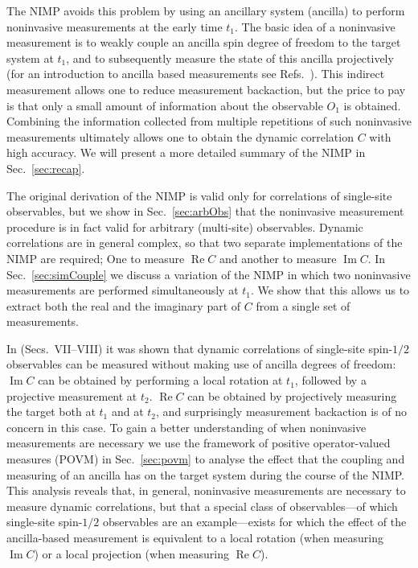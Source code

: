 \documentclass[epjST,numbook]{svjour}
\DeclareMathOperator{\imp }{\mathrm{Im}}
\DeclareMathOperator{\rep}{\mathrm{Re}}
\begin{document}
The NIMP avoids this problem by using an ancillary system (ancilla) to perform noninvasive measurements at the early time $t_1$. The basic idea of a noninvasive measurement is to weakly couple an ancilla spin degree of freedom to the target system at $t_1$, and to subsequently measure the state of this ancilla projectively (for an introduction to ancilla based measurements see Refs.~\cite{Jacobs,NielsenChuang,AsherPeres}). This indirect measurement allows one to reduce measurement backaction, but the price to pay is that only a small amount of information about the observable $O_1$ is obtained. Combining the information collected from multiple repetitions of such noninvasive measurements ultimately allows one to obtain the dynamic correlation $C$ with high accuracy. We will present a more detailed summary of the NIMP in Sec.~\ref{sec:recap}.

The original derivation of the NIMP is valid only for correlations of single-site observables, but we show in Sec.~\ref{sec:arbObs} that the noninvasive measurement procedure is in fact valid for arbitrary (multi-site) observables. Dynamic correlations are in general complex, so that two separate implementations of the NIMP are required; One to measure $\rep C$ and another to measure $\imp C$. In Sec.~\ref{sec:simCouple} we discuss a variation of the NIMP in which two noninvasive measurements are performed simultaneously at $t_1$. We show that this allows us to extract both the real and the imaginary part of $C$ from a single set of measurements.

In \cite{Uhrich_etal} (Secs.~VII--VIII) it was shown that dynamic correlations of single-site \mbox{spin-$1/2$} observables can be measured without making use of ancilla degrees of freedom: $\imp C$ can be obtained by performing a local rotation at $t_1$, followed by a projective measurement at $t_2$. $\rep C$ can be obtained by projectively measuring the target both at $t_1$ and at $t_2$, and surprisingly measurement backaction is of no concern in this case. To gain a better understanding of when noninvasive measurements are necessary we use the framework of positive operator-valued measures (POVM) in Sec.~\ref{sec:povm} to analyse the effect that the coupling and measuring of an ancilla has on the target system during the course of the NIMP. This analysis reveals that, in general, noninvasive measurements are necessary to measure dynamic correlations, but that a special class of observables---of which single-site spin-$1/2$ observables are an example---exists for which the effect of the ancilla-based measurement is equivalent to a local rotation (when measuring $\imp C$) or a local projection (when measuring $\rep C$).
\end{document}
